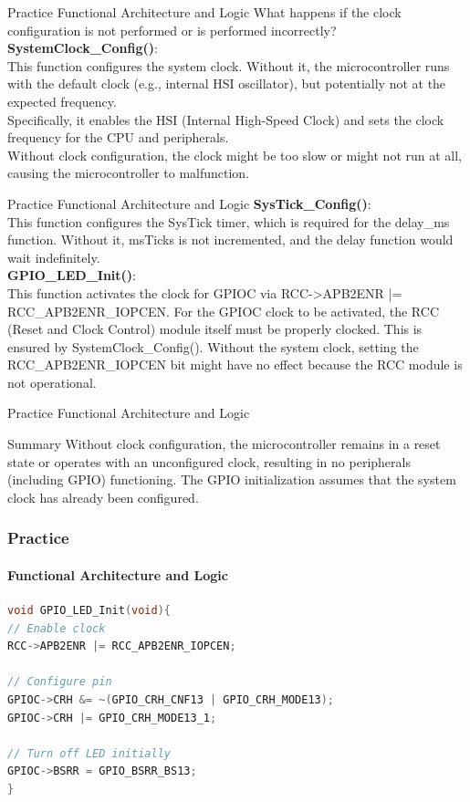 \documentclass{beamer}
\begin{document}
\begin{frame}{Practice}
	{Functional Architecture and Logic}
	What happens if the clock configuration is not performed or is performed incorrectly?\\
	\textbf{SystemClock\_Config()}:\\
	This function configures the system clock. Without it, the microcontroller runs with the default clock (e.g., internal HSI oscillator), but potentially not at the expected frequency.\\
	\vspace{0.2cm}
	Specifically, it enables the HSI (Internal High-Speed Clock) and sets the clock frequency for the CPU and peripherals.\\
	\vspace{0.2cm}
	Without clock configuration, the clock might be too slow or might not run at all, causing the microcontroller to malfunction.
\end{frame}
\begin{frame}{Practice}
	{Functional Architecture and Logic}
	\textbf{SysTick\_Config()}:\\
	This function configures the SysTick timer, which is required for the delay\_ms function. Without it, msTicks is not incremented, and the delay function would wait indefinitely.\\
	\vspace{0.2cm}
	\textbf{GPIO\_LED\_Init()}:\\
	This function activates the clock for GPIOC via RCC->APB2ENR |= RCC\_APB2ENR\_IOPCEN.   
	For the GPIOC clock to be activated, the RCC (Reset and Clock Control) module itself must be properly clocked. This is ensured by SystemClock\_Config().  
	Without the system clock, setting the RCC\_APB2ENR\_IOPCEN bit might have no effect because the RCC module is not operational.
\end{frame}
\begin{frame}{Practice}
	{Functional Architecture and Logic}
	\begin{block}{Summary}
		Without clock configuration, the microcontroller remains in a reset state or operates with an unconfigured clock, resulting in no peripherals (including GPIO) functioning. The GPIO initialization assumes that the system clock has already been configured.
	\end{block}
\end{frame}
\begin{frame}[fragile]
	\frametitle{Practice}
	\framesubtitle{Functional Architecture and Logic}
	\begin{lstlisting}[language=C]
void GPIO_LED_Init(void){
// Enable clock
RCC->APB2ENR |= RCC_APB2ENR_IOPCEN;
			
// Configure pin
GPIOC->CRH &= ~(GPIO_CRH_CNF13 | GPIO_CRH_MODE13);
GPIOC->CRH |= GPIO_CRH_MODE13_1;
			
// Turn off LED initially
GPIOC->BSRR = GPIO_BSRR_BS13;
}
	\end{lstlisting}
\end{frame}
\end{document}
